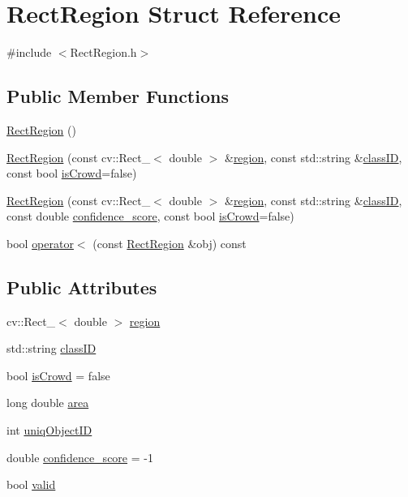 \hypertarget{struct_rect_region}{}\section{Rect\+Region Struct Reference}
\label{struct_rect_region}


{\ttfamily \#include $<$Rect\+Region.\+h$>$}

\subsection*{Public Member Functions}
\begin{DoxyCompactItemize}
\item 
\hyperlink{struct_rect_region_a6bcf2aa0718526273e3ce425b444fcf2}{Rect\+Region} ()
\item 
\hyperlink{struct_rect_region_a42a592c4b20a7a7a25f378b992e478ae}{Rect\+Region} (const cv\+::\+Rect\+\_\+$<$ double $>$ \&\hyperlink{struct_rect_region_ab40e0921a7992a4109ceb7e22adb5d11}{region}, const std\+::string \&\hyperlink{struct_rect_region_a1c182e13d48381afaefeda3d552a6579}{class\+ID}, const bool \hyperlink{struct_rect_region_ae00882e01f648531af0c5135712752e0}{is\+Crowd}=false)
\item 
\hyperlink{struct_rect_region_aa81f73866ff91bd44d8379322b072336}{Rect\+Region} (const cv\+::\+Rect\+\_\+$<$ double $>$ \&\hyperlink{struct_rect_region_ab40e0921a7992a4109ceb7e22adb5d11}{region}, const std\+::string \&\hyperlink{struct_rect_region_a1c182e13d48381afaefeda3d552a6579}{class\+ID}, const double \hyperlink{struct_rect_region_ab7f4217d17c16f194eb43246732050bd}{confidence\+\_\+score}, const bool \hyperlink{struct_rect_region_ae00882e01f648531af0c5135712752e0}{is\+Crowd}=false)
\item 
bool \hyperlink{struct_rect_region_a214aa5e98f4d5e3795e562878bc2dc68}{operator$<$} (const \hyperlink{struct_rect_region}{Rect\+Region} \&obj) const
\end{DoxyCompactItemize}
\subsection*{Public Attributes}
\begin{DoxyCompactItemize}
\item 
cv\+::\+Rect\+\_\+$<$ double $>$ \hyperlink{struct_rect_region_ab40e0921a7992a4109ceb7e22adb5d11}{region}
\item 
std\+::string \hyperlink{struct_rect_region_a1c182e13d48381afaefeda3d552a6579}{class\+ID}
\item 
bool \hyperlink{struct_rect_region_ae00882e01f648531af0c5135712752e0}{is\+Crowd} = false
\item 
long double \hyperlink{struct_rect_region_a085235a3e876d5d9fd9bf22775e3f46c}{area}
\item 
int \hyperlink{struct_rect_region_a6701398d34833514dc6ab12b38d24e3a}{uniq\+Object\+ID}
\item 
double \hyperlink{struct_rect_region_ab7f4217d17c16f194eb43246732050bd}{confidence\+\_\+score} = -\/1
\item 
bool \hyperlink{struct_rect_region_ae322b2513067e035048a88e2fa911455}{valid}
\end{DoxyCompactItemize}


